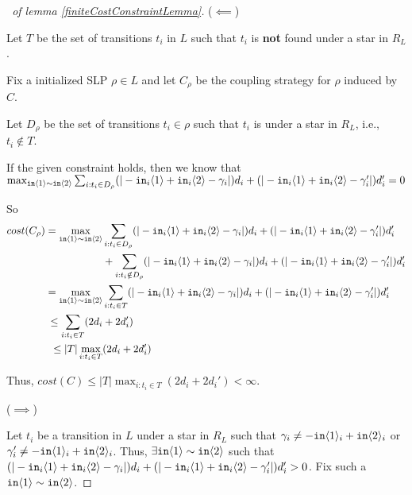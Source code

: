 \begin{proof}[\proofname~of lemma \ref{finiteCostConstraintLemma}]

    ($\impliedby$)

    Let $T$ be the set of transitions $t_i$ in $L$ such that $t_i$ is \textbf{not} found under a star in $R_L$. 

    Fix a initialized SLP $\rho\in L$ and let $C_\rho$ be the coupling strategy for $\rho$ induced by $C$. 

    Let $D_\rho$ be the set of transitions $t_i\in \rho$ such that $t_i$ is under a star in $R_L$, i.e., $t_i\notin T$.  

    If the given constraint holds, then we know that $\max_{\texttt{in}\langle1 \rangle\sim\texttt{in}\langle2 \rangle}\sum_{i: t_i\in D_\rho}(|-\texttt{in}_i\langle1 \rangle+\texttt{in}_i\langle2 \rangle-\gamma_i|)d_i+(|-\texttt{in}_i\langle1 \rangle+\texttt{in}_i\langle2 \rangle-\gamma_i'|)d_i' = 0$

    So \begin{align*}
        cost(C_\rho) = \max_{\texttt{in}\langle1 \rangle\sim\texttt{in}\langle2 \rangle}&\sum_{i: t_i\in D_\rho}(|-\texttt{in}_i\langle1 \rangle+\texttt{in}_i\langle2 \rangle-\gamma_i|)d_i+(|-\texttt{in}_i\langle1 \rangle+\texttt{in}_i\langle2 \rangle-\gamma_i'|)d_i'\\
        &+\sum_{i: t_i\notin D_\rho}(|-\texttt{in}_i\langle1 \rangle+\texttt{in}_i\langle2 \rangle-\gamma_i|)d_i+(|-\texttt{in}_i\langle1 \rangle+\texttt{in}_i\langle2 \rangle-\gamma_i'|)d_i'\\
        = \max_{\texttt{in}\langle1 \rangle\sim\texttt{in}\langle2 \rangle}&\sum_{i: t_i\in T}(|-\texttt{in}_i\langle1 \rangle+\texttt{in}_i\langle2 \rangle-\gamma_i|)d_i+(|-\texttt{in}_i\langle1 \rangle+\texttt{in}_i\langle2 \rangle-\gamma_i'|)d_i'\\
        \leq \sum_{i:t_i\in T}(2d_i& + 2d_i')\\
        \leq |T|\max_{i:t_i\in T}&(2d_i + 2d_i')
    \end{align*}

    Thus, $cost(C)\leq |T|\max_{i:t_i\in T}(2d_i + 2d_i') <\infty$.

    ($\implies$)

    Let $t_i$ be a transition in $L$ under a star in $R_L$ such that $\gamma_i\neq -\texttt{in}\langle1 \rangle_i+\texttt{in}\langle2 \rangle_i$ or $\gamma_i'\neq  -\texttt{in}\langle1 \rangle_i+\texttt{in}\langle2 \rangle_i$.     Thus, $\exists \texttt{in}\langle1 \rangle\sim \texttt{in}\langle2 \rangle$ such that $(|-\texttt{in}_i\langle1 \rangle+\texttt{in}_i\langle2 \rangle-\gamma_i|)d_i+(|-\texttt{in}_i\langle1 \rangle+\texttt{in}_i\langle2 \rangle-\gamma_i'|)d_i'>0$.
    Fix such a $\texttt{in}\langle1 \rangle\sim \texttt{in}\langle2 \rangle$. 


\end{proof}
